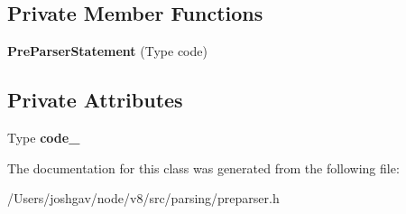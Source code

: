 \subsection*{Private Member Functions}
\begin{DoxyCompactItemize}
\item 
{\bfseries Pre\+Parser\+Statement} (Type code)\hypertarget{classv8_1_1internal_1_1_pre_parser_statement_a5ecaf09deaed06f19ff53ec8a0aeebd6}{}\label{classv8_1_1internal_1_1_pre_parser_statement_a5ecaf09deaed06f19ff53ec8a0aeebd6}

\end{DoxyCompactItemize}
\subsection*{Private Attributes}
\begin{DoxyCompactItemize}
\item 
Type {\bfseries code\+\_\+}\hypertarget{classv8_1_1internal_1_1_pre_parser_statement_a6d306e8d42f33a22e0e507c0999cf37b}{}\label{classv8_1_1internal_1_1_pre_parser_statement_a6d306e8d42f33a22e0e507c0999cf37b}

\end{DoxyCompactItemize}


The documentation for this class was generated from the following file\+:\begin{DoxyCompactItemize}
\item 
/\+Users/joshgav/node/v8/src/parsing/preparser.\+h\end{DoxyCompactItemize}
